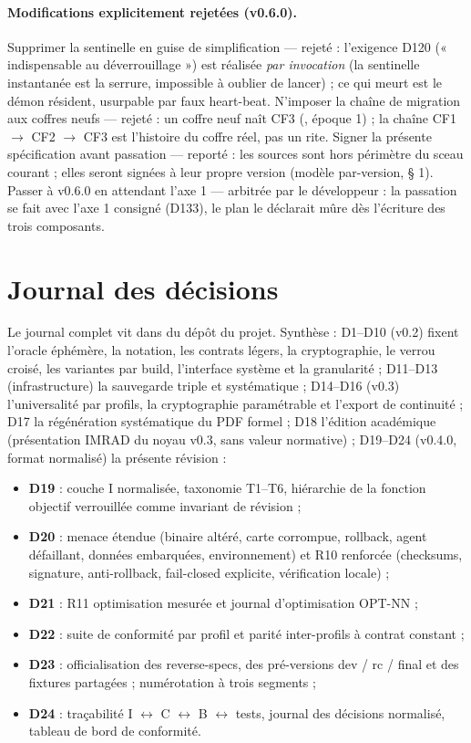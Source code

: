 \paragraph{Modifications explicitement rejetées (v0.6.0).} Supprimer la sentinelle en
 guise de simplification — rejeté : l'exigence D120 (« indispensable au déverrouillage »)
 est réalisée \emph{par invocation} (la sentinelle instantanée est la serrure, impossible
 à oublier de lancer) ; ce qui meurt est le démon résident, usurpable par faux
 heart-beat. N'imposer la chaîne de migration aux coffres neufs — rejeté : un coffre neuf
 naît CF3 (, époque 1) ; la chaîne CF1 $\to$ CF2 $\to$ CF3 est l'histoire du
 coffre réel, pas un rite. Signer la présente spécification avant passation — reporté :
 les sources  sont hors périmètre du sceau courant ; elles seront signées à
 leur propre version (modèle par-version,  § 1). Passer à v0.6.0 en
 attendant l'axe 1 — arbitrée par le développeur : la passation se fait avec l'axe 1
 consigné (D133), le plan le déclarait mûre dès l'écriture des trois composants.

\section{Journal des décisions}\label{sec:decisions}

Le journal complet vit dans  du dépôt du projet. Synthèse :
D1–D10 (v0.2) fixent l'oracle éphémère, la notation, les contrats légers, la
cryptographie, le verrou croisé, les variantes par build, l'interface système et la
granularité ; D11–D13 (infrastructure) la sauvegarde triple et systématique ; D14–D16
(v0.3) l'universalité par profils, la cryptographie paramétrable et l'export de
continuité ; D17 la régénération systématique du PDF formel ; D18 l'édition académique
(présentation IMRAD du noyau v0.3, sans valeur normative) ; D19–D24 (v0.4.0, format
normalisé) la présente révision :

\begin{itemize}[label={}, leftmargin=1.2em]
\item \textbf{D19} : couche I normalisée, taxonomie T1–T6, hiérarchie de la fonction
objectif verrouillée comme invariant de révision ;
\item \textbf{D20} : menace étendue (binaire altéré, carte corrompue, rollback,
agent défaillant, données embarquées, environnement) et R10 renforcée (checksums,
signature, anti-rollback, fail-closed explicite, vérification locale) ;
\item \textbf{D21} : R11 optimisation mesurée et journal d'optimisation OPT-NN ;
\item \textbf{D22} : suite de conformité par profil et parité inter-profils à contrat
constant ;
\item \textbf{D23} : officialisation des reverse-specs, des pré-versions dev / rc /
final et des fixtures partagées ; numérotation à trois segments ;
\item \textbf{D24} : traçabilité I $\leftrightarrow$ C $\leftrightarrow$ B
$\leftrightarrow$ tests, journal des décisions normalisé, tableau de bord de conformité.
\end{itemize}

